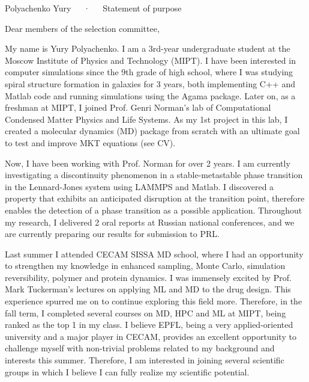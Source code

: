 \documentclass[12pt, a4paper]{awesome-cv}
\begin{document}
\makecvheader[C]

\makecvfooter
  {\thepage}
  {Polyachenko Yury~~~·~~~Statement of purpose}
  {\thepage}

\vspace{25pt}
\hspace{5pt} Dear members of the selection committee, 

\begin{cvletter}


My name is Yury Polyachenko. I am a 3rd-year undergraduate student at the Moscow Institute of Physics and Technology (MIPT). I have been interested in computer simulations since the 9th grade of high school, where I was studying spiral structure formation in galaxies for 3 years, both implementing C++ and Matlab code and running simulations using the Agama package. Later on, as a freshman at MIPT, I joined Prof. Genri Norman's lab of Computational Condensed Matter Physics and Life Systems. As my 1st project in this lab, I created a molecular dynamics (MD) package from scratch with an ultimate goal to test and improve MKT equations (see CV). 

Now, I have been working with Prof. Norman for over 2 years. I am currently investigating a discontinuity phenomenon in a stable-metastable phase transition in the Lennard-Jones system using LAMMPS and Matlab. I discovered a property that exhibits an anticipated disruption at the transition point, therefore enables the detection of a phase transition as a possible application. Throughout my research, I delivered 2 oral reports at Russian national conferences, and we are currently preparing our results for submission to PRL.

Last summer I attended CECAM SISSA MD school, where I had an opportunity to strengthen my knowledge in enhanced sampling, Monte Carlo, simulation reversibility, polymer and protein dynamics. I was immensely excited by Prof. Mark Tuckerman's lectures on applying ML and MD to the drug design. This experience spurred me on to continue exploring this field more. Therefore, in the fall term, I completed several courses on MD, HPC and ML at MIPT, being ranked as the top 1 in my class. I believe EPFL, being a very applied-oriented university and a major player in CECAM, provides an excellent opportunity to challenge myself with non-trivial problems related to my background and interests this summer. Therefore, I am interested in joining several scientific groups in which I believe I can fully realize my scientific potential.


\end{cvletter}
\end{document}
